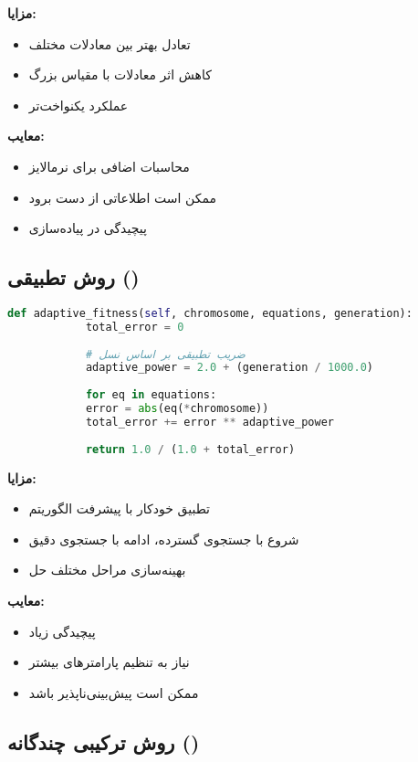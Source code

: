 \documentclass[12pt,a4paper]{article}
\newenvironment{ltrcode}{\lr\bgroup}{\egroup}
\begin{document}
	\textbf{مزایا:}
	\begin{itemize}
		\item تعادل بهتر بین معادلات مختلف
		\item کاهش اثر معادلات با مقیاس بزرگ
		\item عملکرد یکنواخت‌تر
	\end{itemize}
	
	\textbf{معایب:}
	\begin{itemize}
		\item محاسبات اضافی برای نرمالایز
		\item ممکن است اطلاعاتی از دست برود
		\item پیچیدگی در پیاده‌سازی
	\end{itemize}
	
	\subsection{روش تطبیقی ()}
	
	\begin{ltrcode}
		\begin{lstlisting}[language=Python, caption=تابع شایستگی تطبیقی]
			def adaptive_fitness(self, chromosome, equations, generation):
			total_error = 0
			
			# ضریب تطبیقی بر اساس نسل
			adaptive_power = 2.0 + (generation / 1000.0)
			
			for eq in equations:
			error = abs(eq(*chromosome))
			total_error += error ** adaptive_power
			
			return 1.0 / (1.0 + total_error)
		\end{lstlisting}
	\end{ltrcode}
	
	\textbf{مزایا:}
	\begin{itemize}
		\item تطبیق خودکار با پیشرفت الگوریتم
		\item شروع با جستجوی گسترده، ادامه با جستجوی دقیق
		\item بهینه‌سازی مراحل مختلف حل
	\end{itemize}
	
	\textbf{معایب:}
	\begin{itemize}
		\item پیچیدگی زیاد
		\item نیاز به تنظیم پارامترهای بیشتر
		\item ممکن است پیش‌بینی‌ناپذیر باشد
	\end{itemize}
	
	\subsection{روش ترکیبی چندگانه ()}
	
\end{document}
